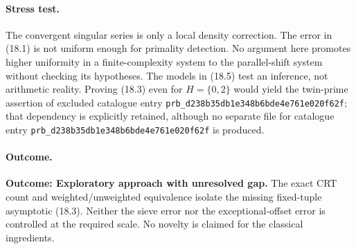 \documentclass[11pt,a4paper]{article}
\begin{document}
\paragraph{Stress test.}
The convergent singular series is only a local density correction. The
error in (18.1) is not uniform enough for primality detection. No argument
here promotes higher uniformity in a finite-complexity system to the
parallel-shift system without checking its hypotheses. The models in
(18.5) test an inference, not arithmetic reality. Proving (18.3) even for
$H=\{0,2\}$ would yield the twin-prime assertion of excluded catalogue entry \texttt{prb\_d238b35db1e348b6bde4e761e020f62f};
that dependency is explicitly retained, although no separate file for
catalogue entry \texttt{prb\_d238b35db1e348b6bde4e761e020f62f} is produced.

\paragraph{Outcome.}
\textbf{Outcome: Exploratory approach with unresolved gap.}
The exact CRT count and weighted/unweighted equivalence isolate the
missing fixed-tuple asymptotic (18.3). Neither the sieve error nor the
exceptional-offset error is controlled at the required scale. No novelty
is claimed for the classical ingredients.
\end{document}
